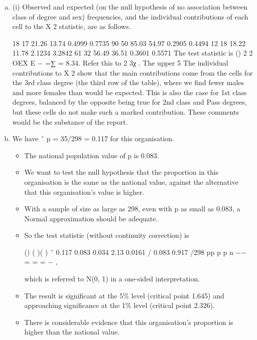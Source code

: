 \documentclass[a4paper,12pt]{article}
\begin{document}
\begin{enumerate}[(a)]
    \item  
(i) Observed and expected (on the null hypothesis of no association between class of degree and sex) frequencies, and the individual contributions of each cell to the X 2 statistic, are as follows. 
 
18 17   21.26 13.74   0.4999 0.7735 90 50   85.03 54.97   0.2905 0.4494 12 18   18.22 11.78   2.1234 3.2842 61 32   56.49 36.51   0.3601 0.5571 
 The test statistic is () 2 2 OEX E − =∑ = 8.34.  Refer this to 2 3χ .  The upper 5%
 The individual contributions to X 2 show that the main contributions come from the cells for the 3rd class degree (the third row of the table), where we find fewer males and more females than would be expected.  This is also the case for 1st class degrees, balanced by the opposite being true for 2nd class and Pass degrees, but these cells do not make such a marked contribution.  These comments would be the substance of the report. 
 
 
\item  We have ˆ p = 35/298 = 0.117 for this organisation.  
\begin{itemize}
    \item The national population value of p is 0.083. 
    \item We want to test the null hypothesis that the proportion in this organisation is the same as the national value, against the alternative that this organisation's value is higher. 
    \item With a sample of size as large as 298, even with p as small as 0.083, a Normal approximation should be adequate.
    \item So the test statistic (without continuity correction) is 
 
() ( )( ) ˆ 0.117 0.083 0.034 2.13 0.0161 / 0.083 0.917 /298 pp p p n −− = = = − , 
 
which is referred to N(0, 1) in a one-sided interpretation.
\item The result is significant at the 5\% level (critical point 1.645) and approaching significance at the 1\% level (critical point 2.326).  
\item There is considerable evidence that this organisation's proportion is higher than the national value. 
\end{itemize}
 

\end{enumerate}
\end{document}
